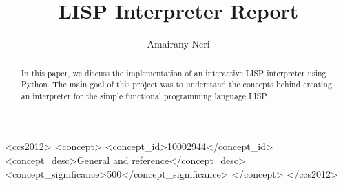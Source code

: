 \documentclass[sigconf]{acmart}
\begin{document}
\title{LISP Interpreter Report}

\author{Amairany Neri}

\renewcommand{\shortauthors}{Neri}
\acmConference[]{}{}{}

\begin{abstract}
    In this paper, we discuss the implementation of an interactive LISP interpreter using Python.
    The main goal of this project was to understand the concepts behind creating an interpreter
    for the simple functional programming language LISP.
\end{abstract}

\begin{CCSXML}
<ccs2012>
<concept>
<concept_id>10002944</concept_id>
<concept_desc>General and reference</concept_desc>
<concept_significance>500</concept_significance>
</concept>
</ccs2012>
\end{CCSXML}


\maketitle
\end{document}
